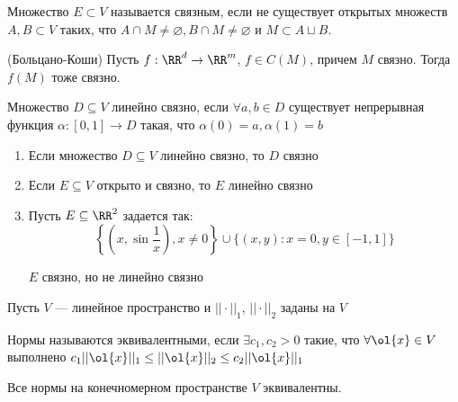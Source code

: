 \begin{defn}{}{}
    Множество \( E \subset V \) называется связным,
    если не существует открытых множеств \( A, B \subset V \) таких,
    что \( A \cap M \neq \varnothing, B \cap M \neq \varnothing \) и \( M \subset A \sqcup B \).
\end{defn}

\begin{thrm}{(Больцано-Коши)}{}
    Пусть \( f : \RR^d \to \RR^m \), \( f \in C(M) \), причем \( M \) связно.
    Тогда \( f(M) \) тоже связно.
\end{thrm}

\begin{defn}{}{}
    Множество \( D \subseteq V \) линейно связно,
    если \( \forall a, b \in D \) существует непрерывная функция \( \alpha : [0, 1] \to D \)
    такая, что \( \alpha(0) = a, \alpha(1) = b \)
\end{defn}

\begin{exercise}{}{}
    \begin{enumerate}
        \item
            Если множество \( D \subseteq V \) линейно связно, то \( D \) связно
        \item
            Если \( E \subseteq V \) открыто и связно, то \( E \) линейно связно
        \item
            Пусть \( E \subseteq \RR^2 \) задается так:
            \[
                \left\{ \left( x, \sin \frac{1}{x} \right), x \neq 0 \right\} \cup \{ (x, y) : x = 0, y \in [-1, 1] \}
            \]

            \( E \) связно, но не линейно связно
    \end{enumerate}
\end{exercise}

\begin{defn}{}{}

    Пусть \( V \) --- линейное пространство и \( || \cdot ||_1 \), \( || \cdot ||_2 \) заданы на \( V \)

    Нормы называются эквивалентными, если \( \exists c_1, c_2 > 0 \) такие,
    что \( \forall \ol{x} \in V \) выполнено
    \(
        c_1 || \ol{x} ||_1 \leq || \ol{x} ||_2 \leq c_2 || \ol{x} ||_1
    \)
\end{defn}

\begin{thrm}{}{}
    Все нормы на конечномерном пространстве \( V \) эквивалентны.
\end{thrm}

